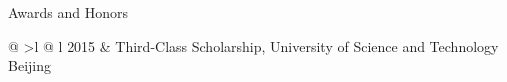\documentclass[UTF8]{resume}    %
\begin{document}

\begin{rSection}{Awards and Honors}

\begin{tabular}{ @ {} >{\em}l @{\hspace{6ex}} l }
2015 & Third-Class Scholarship, University of Science and Technology Beijing\\
\end{tabular}
    
\end{rSection}



\end{document}
